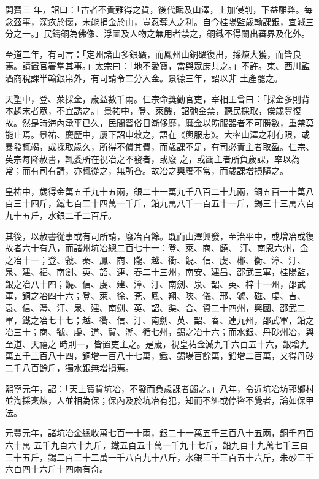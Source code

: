 \begin{pinyinscope}
 開寶三
 年，詔曰：「古者不貴難得之貨，後代賦及山澤，上加侵削，下益雕弊。每念茲事，深疚於懷，未能捐金於山，豈忍奪人之利。自今桂陽監歲輸課銀，宜減三分之一。」民鑄銅為佛像、浮圖及人物之無用者禁之，銅鐵不得闌出蕃界及化外。



 至道二年，有司言：「定州諸山多銀礦，而鳳州山銅礦復出，採煉大獲，而皆良焉。請置官署掌其事。」太宗曰：「地不愛寶，當與眾庶共之。」不許。東、西川監酒商稅課半輸銀帛外，有司請令二分入金。景德三年，詔以非
 土產罷之。



 天聖中，登、萊採金，歲益數千兩。仁宗命獎勸官吏，宰相王曾曰：「採金多則背本趨末者眾，不宜誘之。」景祐中，登、萊饑，詔弛金禁，聽民採取，俟歲豐復故。然是時海內承平已久，民間習俗日漸侈靡，糜金以飭服器者不可勝數，重禁莫能止焉。景祐、慶歷中，屢下詔申敕之，語在《輿服志》。大率山澤之利有限，或暴發輒竭，或採取歲久，所得不償其費，而歲課不足，有司必責主者取盈。仁宗、英宗每降赦書，輒委所在視冶之不發者，或廢
 之，或蠲主者所負歲課，率以為常；而有司有請，亦輒從之，無所吝。故冶之興廢不常，而歲課增損隨之。



 皇祐中，歲得金萬五千九十五兩，銀二十一萬九千八百二十九兩，銅五百一十萬八百三十四斤，鐵七百二十四萬一千斤，鉛九萬八千一百五十一斤，錫三十三萬六百九十五斤，水銀二千二百斤。



 其後，以赦書從事或有司所請，廢冶百餘。既而山澤興發，至治平中，或增冶或復故者六十有八，而諸州坑冶總二百七十一：登、萊、商、饒、
 汀、南恩六州，金之冶十一；登、虢、秦、鳳、商、隴、越、衢、饒、信、虔、郴、衡、漳、汀、泉、建、福、南劍、英、韶、連、春二十三州，南安、建昌、邵武三軍，桂陽監，銀之冶八十四；饒、信、虔、建、漳、汀、南劍、泉、韶、英、梓十一州，邵武軍，銅之冶四十六；登、萊、徐、兗、鳳、翔、陜、儀、邢、虢、磁、虔、吉、袁、信、澧、汀、泉、建、南劍、英、韶、渠、合、資二十四州，興國、邵武二軍，鐵之冶七十七；越、衢、信、汀、南劍、英、韶、春、連九州，邵武軍，鉛之冶三十；商、虢、虔、道、賀、潮、循七州，錫之冶十六；而水銀、丹砂州冶，與至道、天禧之
 時則一，皆置吏主之。是歲，視皇祐金減九千六百五十六，銀增九萬五千三百八十四，銅增一百八十七萬，鐵、錫場百餘萬，鉛增二百萬，又得丹砂二千八百餘斤，獨水銀無增損焉。



 熙寧元年，詔：「天上寶貨坑冶，不發而負歲課者蠲之。」八年，令近坑冶坊郭鄉村並淘採烹煉，人並相為保；保內及於坑冶有犯，知而不糾或停盜不覺者，論如保甲法。



 元豐元年，諸坑冶金總收萬七百一十兩，銀二十一萬五千三百八十五兩，銅千四百六十萬
 五千九百六十九斤，鐵五百五十萬一千九十七斤，鉛九百十九萬七千三百三十五斤，錫二百三十二萬一千八百九十八斤，水銀三千三百五十六斤，朱砂三千六百四十六斤十四兩有奇。




\end{pinyinscope}
